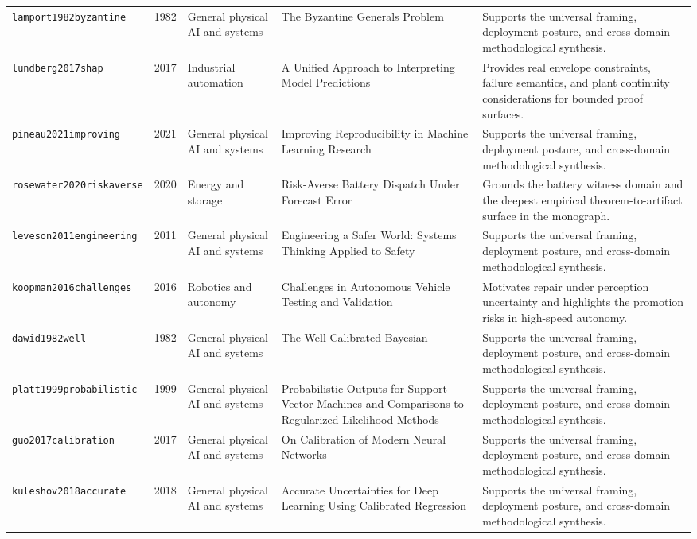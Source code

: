 \begin{longtable}{p{}p{}p{}p{}p{}}
\texttt{lamport1982byzantine} & 1982 & General physical AI and systems & The Byzantine Generals Problem & Supports the universal framing, deployment posture, and cross-domain methodological synthesis.\\
\texttt{lundberg2017shap} & 2017 & Industrial automation & A Unified Approach to Interpreting Model Predictions & Provides real envelope constraints, failure semantics, and plant continuity considerations for bounded proof surfaces.\\
\texttt{pineau2021improving} & 2021 & General physical AI and systems & Improving Reproducibility in Machine Learning Research & Supports the universal framing, deployment posture, and cross-domain methodological synthesis.\\
\texttt{rosewater2020riskaverse} & 2020 & Energy and storage & Risk-Averse Battery Dispatch Under Forecast Error & Grounds the battery witness domain and the deepest empirical theorem-to-artifact surface in the monograph.\\
\texttt{leveson2011engineering} & 2011 & General physical AI and systems & Engineering a Safer World: Systems Thinking Applied to Safety & Supports the universal framing, deployment posture, and cross-domain methodological synthesis.\\
\texttt{koopman2016challenges} & 2016 & Robotics and autonomy & Challenges in Autonomous Vehicle Testing and Validation & Motivates repair under perception uncertainty and highlights the promotion risks in high-speed autonomy.\\
\texttt{dawid1982well} & 1982 & General physical AI and systems & The Well-Calibrated Bayesian & Supports the universal framing, deployment posture, and cross-domain methodological synthesis.\\
\texttt{platt1999probabilistic} & 1999 & General physical AI and systems & Probabilistic Outputs for Support Vector Machines and Comparisons to Regularized Likelihood Methods & Supports the universal framing, deployment posture, and cross-domain methodological synthesis.\\
\texttt{guo2017calibration} & 2017 & General physical AI and systems & On Calibration of Modern Neural Networks & Supports the universal framing, deployment posture, and cross-domain methodological synthesis.\\
\texttt{kuleshov2018accurate} & 2018 & General physical AI and systems & Accurate Uncertainties for Deep Learning Using Calibrated Regression & Supports the universal framing, deployment posture, and cross-domain methodological synthesis.\\

\end{longtable}
